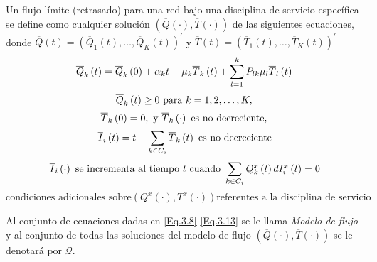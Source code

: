 \begin{Def}
Un flujo l\'imite (retrasado) para una red bajo una disciplina de
servicio espec\'ifica se define como cualquier soluci\'on
 $\left(\overline{Q}\left(\cdot\right),\overline{T}\left(\cdot\right)\right)$ de las siguientes ecuaciones, donde
$\overline{Q}\left(t\right)=\left(\overline{Q}_{1}\left(t\right),\ldots,\overline{Q}_{K}\left(t\right)\right)^{'}$
y
$\overline{T}\left(t\right)=\left(\overline{T}_{1}\left(t\right),\ldots,\overline{T}_{K}\left(t\right)\right)^{'}$
\begin{equation}\label{Eq.3.8}
\overline{Q}_{k}\left(t\right)=\overline{Q}_{k}\left(0\right)+\alpha_{k}t-\mu_{k}\overline{T}_{k}\left(t\right)+\sum_{l=1}^{k}P_{lk}\mu_{l}\overline{T}_{l}\left(t\right)\\
\end{equation}
\begin{equation}\label{Eq.3.9}
\overline{Q}_{k}\left(t\right)\geq0\textrm{ para }k=1,2,\ldots,K,\\
\end{equation}
\begin{equation}\label{Eq.3.10}
\overline{T}_{k}\left(0\right)=0,\textrm{ y }\overline{T}_{k}\left(\cdot\right)\textrm{ es no decreciente},\\
\end{equation}
\begin{equation}\label{Eq.3.11}
\overline{I}_{i}\left(t\right)=t-\sum_{k\in C_{i}}\overline{T}_{k}\left(t\right)\textrm{ es no decreciente}\\
\end{equation}
\begin{equation}\label{Eq.3.12}
\overline{I}_{i}\left(\cdot\right)\textrm{ se incrementa al tiempo }t\textrm{ cuando }\sum_{k\in C_{i}}Q_{k}^{x}\left(t\right)dI_{i}^{x}\left(t\right)=0\\
\end{equation}
\begin{equation}\label{Eq.3.13}
\textrm{condiciones adicionales sobre
}\left(Q^{x}\left(\cdot\right),T^{x}\left(\cdot\right)\right)\textrm{
referentes a la disciplina de servicio}
\end{equation}
\end{Def}

Al conjunto de ecuaciones dadas en \ref{Eq.3.8}-\ref{Eq.3.13} se
le llama {\em Modelo de flujo} y al conjunto de todas las
soluciones del modelo de flujo
$\left(\overline{Q}\left(\cdot\right),\overline{T}
\left(\cdot\right)\right)$ se le denotar\'a por $\mathcal{Q}$.

